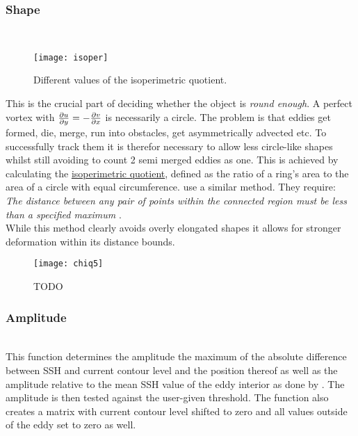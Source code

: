 \subsubsection{Shape}\label{filter:shape}
\\
\begin{wrapfigure}{r}{0.4\textwidth}
	\texttt{[image: isoper]}
	\caption{Different values of the isoperimetric quotient.}
	\label{fig:isoper}
\end{wrapfigure}
This is the crucial part of deciding whether the object is \textit{round
enough}. A perfect vortex with $\frac{\partial u}{\partial y}=-\frac{\partial v}{\partial x}$ is necessarily a
circle. The problem is that eddies get formed, die, merge, run into obstacles,
get asymmetrically advected etc. To successfully track them it is therefor
necessary to allow less circle-like shapes whilst still avoiding to \eg count 2
semi merged eddies as one.
This is achieved by calculating the \hyperref[def:IQ]{isoperimetric quotient},
defined as the ratio of a ring's area to the area of a circle with equal
circumference. \cite{Chelton2011} use a similar method. They
require:\\ \textit{The distance between any pair of points within the connected
region must be less than a specified maximum} \citep{Chelton2011}.\\
While this method clearly avoids overly elongated shapes it allows for stronger
deformation within its distance bounds.
\begin{figure}
	\begin{center}
		\vspace{-80pt}
		\texttt{[image: chiq5]}
		\vspace{-80pt}
		\caption{TODO}
		\label{fig:chiq5}
	\end{center}
\end{figure}
\subsubsection{Amplitude} \label{filter:amp}
\\
This function determines the amplitude \ie the maximum of the absolute
difference between SSH and current contour level and the position thereof as
well as the amplitude relative to the mean SSH value of the eddy interior as
done by \cite{Chelton2011}. The
amplitude is then tested against the user-given threshold. The function also
creates a matrix with current contour level shifted to zero and all values
outside of the eddy set to zero as well.
